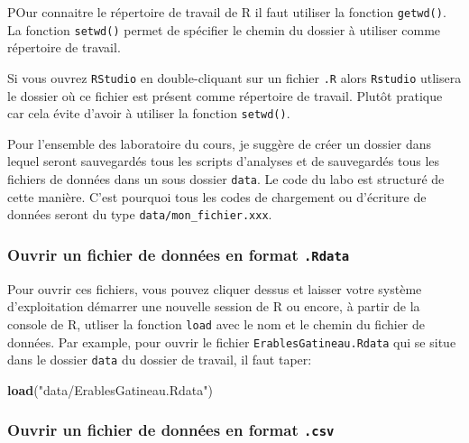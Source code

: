 \documentclass[12pt,]{book}
\makeatletter
\newenvironment{Shaded}{\begin{snugshade}}{\end{snugshade}}
\newcommand{\KeywordTok}[1]{\textcolor[rgb]{0.13,0.29,0.53}{\textbf{#1}}}
\newcommand{\NormalTok}[1]{#1}
\newcommand{\StringTok}[1]{\textcolor[rgb]{0.31,0.60,0.02}{#1}}
\newenvironment{kframe}{%
\medskip{}
\setlength{\fboxsep}{.8em}
\def\at@end@of@kframe{}%
\ifinner\ifhmode%
 \def\at@end@of@kframe{\end{minipage}}%
 \begin{minipage}{\columnwidth}%
\fi\fi%
\def\FrameCommand##1{\hskip\@totalleftmargin \hskip-\fboxsep
\colorbox{incolor}{##1}\hskip-\fboxsep
    \hskip-\linewidth \hskip-\@totalleftmargin \hskip\columnwidth}%
\MakeFramed {\advance\hsize-\width
  \@totalleftmargin\z@ \linewidth\hsize
  \@setminipage}}%
{\par\unskip\endMakeFramed%
\at@end@of@kframe}
\newenvironment{rmdblock}[1]
 {
 \begin{itemize}
 \renewcommand{\labelitemi}{
   \raisebox{-.7\height}[0pt][0pt]{
     {\setkeys{Gin}{width=3em,keepaspectratio}\texttt{[image: images/\#1]}}
   }
 }
 \begin{kframe}
 \setlength{\fboxsep}{1em}
 \item
 }
 {
 \end{kframe}
 \end{itemize}
 }
\newenvironment{rmdimportant}
  {\begin{rmdblock}{important}}
  {\end{rmdblock}}
\newenvironment{rmdtip}
  {\begin{rmdblock}{tip}}
  {\end{rmdblock}}
\makeatother
\begin{document}
POur connaitre le répertoire de travail de R il faut utiliser la fonction \texttt{getwd()}. La fonction \texttt{setwd()} permet de spécifier le chemin du dossier à utiliser comme répertoire de travail.

\begin{rmdtip}
Si vous ouvrez \texttt{RStudio} en double-cliquant sur un fichier \texttt{.R} alors \texttt{Rstudio} utlisera le dossier où ce fichier est présent comme répertoire de travail. Plutôt pratique car cela évite d'avoir à utiliser la fonction \texttt{setwd()}.
\end{rmdtip}

\begin{rmdimportant}
Pour l'ensemble des laboratoire du cours, je suggère de créer un dossier dans lequel seront sauvegardés tous les scripts d'analyses et de sauvegardés tous les fichiers de données dans un sous dossier \texttt{data}. Le code du labo est structuré de cette manière. C'est pourquoi tous les codes de chargement ou d'écriture de données seront du type \texttt{data/mon\_fichier.xxx}.
\end{rmdimportant}

\hypertarget{ouvrir-un-fichier-de-donnuxe9es-en-format-.rdata}{%
\subsubsection{\texorpdfstring{Ouvrir un fichier de données en format \texttt{.Rdata}}{Ouvrir un fichier de données en format .Rdata}}\label{ouvrir-un-fichier-de-donnuxe9es-en-format-.rdata}}

Pour ouvrir ces fichiers, vous pouvez cliquer dessus et laisser votre système d'exploitation démarrer une nouvelle session de R ou encore, à partir de la console de R, utliser la fonction \texttt{load} avec le nom et le chemin du fichier de données.
Par example, pour ouvrir le fichier \texttt{ErablesGatineau.Rdata} qui se situe dans le dossier \texttt{data} du dossier de travail, il faut taper:

\begin{Shaded}
\begin{Highlighting}[]
\KeywordTok{load}\NormalTok{(}\StringTok{"data/ErablesGatineau.Rdata"}\NormalTok{)}
\end{Highlighting}
\end{Shaded}

\hypertarget{ouvrir-un-fichier-de-donnuxe9es-en-format-.csv}{%
\subsubsection{\texorpdfstring{Ouvrir un fichier de données en format \texttt{.csv}}{Ouvrir un fichier de données en format .csv}}\label{ouvrir-un-fichier-de-donnuxe9es-en-format-.csv}}
\end{document}
